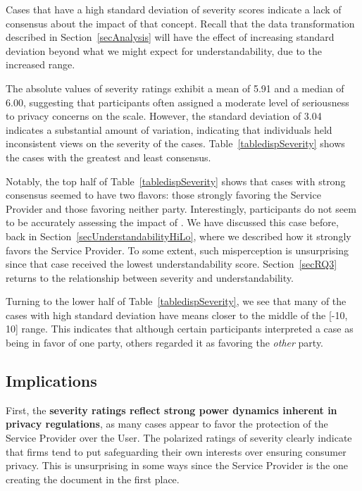 

Cases that have a high standard deviation of severity scores indicate a lack of consensus about the impact of that concept.
Recall that the data transformation described in Section~\ref{secAnalysis} will have the effect of increasing standard deviation beyond what we might expect for understandability, due to the increased range.

The absolute values of severity ratings exhibit a mean of 5.91 and a median of 6.00, suggesting that participants often assigned a moderate level of seriousness to privacy concerns on the scale.
However, the standard deviation of 3.04 indicates a substantial amount of variation, indicating that individuals held inconsistent views on the severity of the cases.
Table~\ref{tabledispSeverity} shows the cases with the greatest and least consensus.

Notably, the top half of Table~\ref{tabledispSeverity} shows that cases with strong consensus seemed to have two flavors: those strongly favoring the Service Provider and those favoring neither party.
Interestingly, participants do not seem to be accurately assessing the impact of .
We have discussed this case before, back in Section~\ref{secUnderstandabilityHiLo}, where we described how it strongly favors the Service Provider.
To some extent, such misperception is unsurprising since that case received the lowest understandability score.
Section~\ref{secRQ3} returns to the relationship between severity and understandability.

Turning to the lower half of Table~\ref{tabledispSeverity}, we see that many of the cases with high standard deviation have means closer to the middle of the [-10, 10] range.
This indicates that although certain participants interpreted a case as being in favor of one party, others regarded it as favoring the \textit{other} party.

\subsection{Implications}

First, the \textbf{severity ratings reflect strong power dynamics inherent in privacy regulations}, as many cases appear to favor the protection of the Service Provider over the User.
The polarized ratings of severity clearly indicate that firms tend to put safeguarding their own interests over ensuring consumer privacy.
This is unsurprising in some ways since the Service Provider is the one creating the document in the first place.

